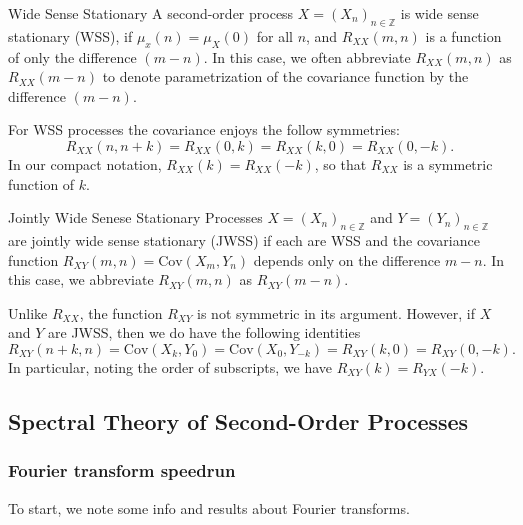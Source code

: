 \documentclass{article}
\begin{document}
\begin{defn}{Wide Sense Stationary}{}
A second-order process \( X = (X_{n} )_{n\in \mathbb{Z} }  \) is wide sense stationary (WSS), if \( \mu _{x} (n) = \mu _{X} (0)\) for all \( n \), and \( R_{XX}(m,n)  \) is a function of only the difference $(m-n)$. In this case, we often abbreviate \( R_{X  X}(m,n) \) as \( R_{X X}(m - n) \) to denote parametrization of the covariance function by the difference \( (m - n) \). 
\end{defn}

\begin{rmk}{}{}
For WSS processes the covariance enjoys the follow symmetries:
\[
    R_{XX} (n,n + k) = R_{X X}(0,k) = R_{X X}(k, 0) = R _{X X}(0,- k).
\]
In our compact notation, \( R_{X X}(k)= R_{X X}(-k) \), so that \(  R_{X X} \) is a symmetric function of \( k \). 
\end{rmk}

\begin{defn}{Jointly Wide Senese Stationary}{}
    Processes \( X = (X_{n} )_{n \in \mathbb{Z}}  \) and \( Y = (Y_{n} )_{n \in \mathbb{Z}} \) are jointly wide sense stationary (JWSS) if each are WSS and the covariance function \( R_{XY} (m,n) = \mathrm{Cov} (X_{m}, Y_{n} )\) depends only on the difference \( m - n \). In this case, we abbreviate \( R_{XY} (m,n) \) as \( R_{XY}(m - n)  \). 

\end{defn}
\begin{rmk}{}{}
    Unlike \( R_{X X} \), the function \( R_{XY} \) is not symmetric in its argument. However, if \( X \) and \( Y \) are JWSS, then we do have the following identities
    \[
        R_{XY} (n + k, n) = \mathrm{Cov} (X_{k} , Y_0) = \mathrm{Cov} (X_{0} , Y_ {- k} ) = R_{XY}(k,0) = R_{XY} (0,- k).  
    \]
    In particular, noting the order of subscripts, we have \( R_{XY} (k) = R_{YX} (- k) \). 
\end{rmk}

\subsection{Spectral Theory of Second-Order Processes}


\subsubsection{Fourier transform speedrun}
To start, we note some info and results about Fourier transforms. 
\end{document}
